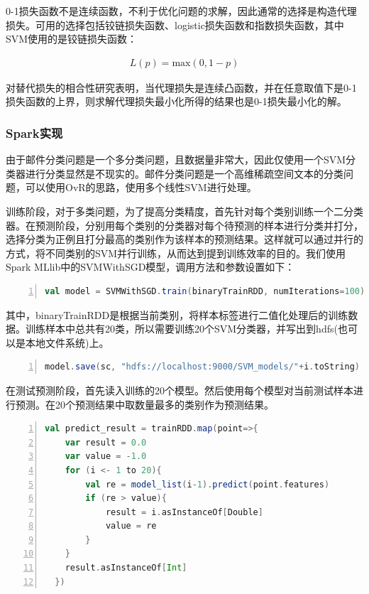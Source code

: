 \documentclass[lang=cn,11pt]{elegantpaper}
\begin{document}
0-1损失函数不是连续函数，不利于优化问题的求解，因此通常的选择是构造代理损失。可用的选择包括铰链损失函数、logistic损失函数和指数损失函数，其中SVM使用的是铰链损失函数：\par
\begin{align*}
	L(p)=\text{max}(0,1-p)
\end{align*}

对替代损失的相合性研究表明，当代理损失是连续凸函数，并在任意取值下是0-1损失函数的上界，则求解代理损失最小化所得的结果也是0-1损失最小化的解。\par

\subsubsection{Spark实现}
由于邮件分类问题是一个多分类问题，且数据量非常大，因此仅使用一个SVM分类器进行分类显然是不现实的。邮件分类问题是一个高维稀疏空间文本的分类问题，可以使用OvR的思路，使用多个线性SVM进行处理。\par
训练阶段，对于多类问题，为了提高分类精度，首先针对每个类别训练一个二分类器。在预测阶段，分别用每个类别的分类器对每个待预测的样本进行分类并打分，选择分类为正例且打分最高的类别作为该样本的预测结果。这样就可以通过并行的方式，将不同类别的SVM并行训练，从而达到提到训练效率的目的。我们使用Spark MLlib中的SVMWithSGD模型，调用方法和参数设置如下：\par
\begin{lstlisting}[language={Scala},numbers=left,numberstyle=\tiny,%frame=shadowbox,  
  rulesepcolor=\color{red!20!green!20!blue!20},  
  keywordstyle=\color{blue!70!black},  
  commentstyle=\color{blue!90!},  
  basicstyle=\ttfamily]
  val model = SVMWithSGD.train(binaryTrainRDD, numIterations=100)
\end{lstlisting}\par
其中，binaryTrainRDD是根据当前类别，将样本标签进行二值化处理后的训练数据。训练样本中总共有20类，所以需要训练20个SVM分类器，并写出到hdfs(也可以是本地文件系统)上。\par
\begin{lstlisting}[language={Scala},numbers=left,numberstyle=\tiny,%frame=shadowbox,  
  rulesepcolor=\color{red!20!green!20!blue!20},  
  keywordstyle=\color{blue!70!black},  
  commentstyle=\color{blue!90!},  
  basicstyle=\ttfamily]
  model.save(sc, "hdfs://localhost:9000/SVM_models/"+i.toString)
\end{lstlisting}\par
在测试预测阶段，首先读入训练的20个模型。然后使用每个模型对当前测试样本进行预测。在20个预测结果中取数量最多的类别作为预测结果。
\begin{lstlisting}[language={Scala},numbers=left,numberstyle=\tiny,%frame=shadowbox,  
  rulesepcolor=\color{red!20!green!20!blue!20},  
  keywordstyle=\color{blue!70!black},  
  commentstyle=\color{blue!90!},  
  basicstyle=\ttfamily]
  val predict_result = trainRDD.map(point=>{
  	var result = 0.0
  	var value = -1.0
  	for (i <- 1 to 20){
  		val re = model_list(i-1).predict(point.features)
  		if (re > value){
  			result = i.asInstanceOf[Double]
  			value = re
  		}
  	}
  	result.asInstanceOf[Int]
  })
\end{lstlisting}\par
\end{document}
